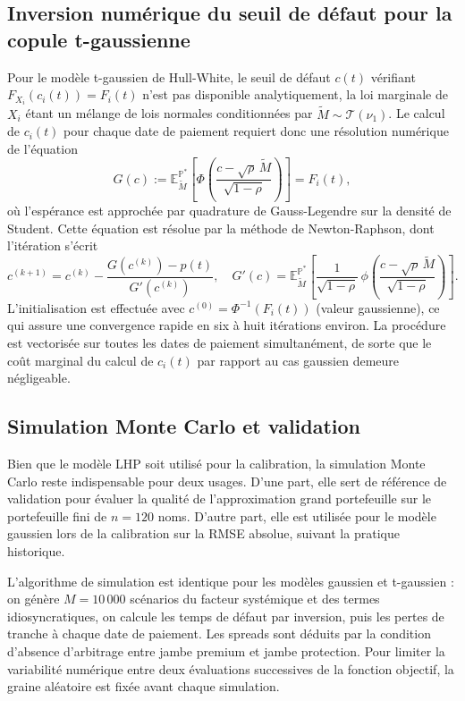\subsection{Inversion numérique du seuil de défaut pour la copule t-gaussienne}

Pour le modèle t-gaussien de Hull-White, le seuil de défaut $c(t)$ vérifiant
$F_{X_i}(c_i(t)) = F_i(t)$ n'est pas disponible analytiquement, la loi marginale de $X_i$ étant un
mélange de lois normales conditionnées par $\tilde{M} \sim \mathcal{T}(\nu_1)$. Le calcul de $c_i(t)$ pour
chaque date de paiement requiert donc une résolution numérique de l'équation
\begin{equation}
    G(c) := \mathbb{E}^{\mathbb{P}^\ast}_{\tilde{M}}\!\left[\Phi\!\left(\frac{c - \sqrt{\rho}\,\tilde{M}}{\sqrt{1-\rho}}\right)\right] = F_i(t),
\end{equation}
où l'espérance est approchée par quadrature de Gauss-Legendre sur la densité de Student.
Cette équation est résolue par la méthode de Newton-Raphson, dont l'itération s'écrit
\begin{equation}
    c^{(k+1)} = c^{(k)} - \frac{G(c^{(k)}) - p(t)}{G'(c^{(k)})},
    \quad G'(c) = \mathbb{E}^{\mathbb{P}^\ast}_{\tilde{M}}\!\left[\frac{1}{\sqrt{1-\rho}}\,\phi\!\left(\frac{c - \sqrt{\rho}\,\tilde{M}}{\sqrt{1-\rho}}\right)\right].
\end{equation}
L'initialisation est effectuée avec $c^{(0)} = \Phi^{-1}(F_i(t))$ (valeur gaussienne), ce qui
assure une convergence rapide en six à huit itérations environ. La procédure est vectorisée
sur toutes les dates de paiement simultanément, de sorte que le coût marginal du calcul de
$c_i(t)$ par rapport au cas gaussien demeure négligeable.

\subsection{Simulation Monte Carlo et validation}

Bien que le modèle LHP soit utilisé pour la calibration, la simulation Monte Carlo reste
indispensable pour deux usages. D'une part, elle sert de référence de validation pour évaluer
la qualité de l'approximation grand portefeuille sur le portefeuille fini de $n = 120$ noms.
D'autre part, elle est utilisée pour le modèle gaussien lors de la calibration sur la RMSE
absolue, suivant la pratique historique.

L'algorithme de simulation est identique pour les modèles gaussien et t-gaussien : on génère
$M = 10\,000$ scénarios du facteur systémique et des termes idiosyncratiques, on calcule les
temps de défaut par inversion, puis les pertes de tranche à chaque date de paiement. Les
spreads sont déduits par la condition d'absence d'arbitrage entre jambe premium et jambe
protection. Pour limiter la variabilité numérique entre deux évaluations successives de la
fonction objectif, la graine aléatoire est fixée avant chaque simulation.

